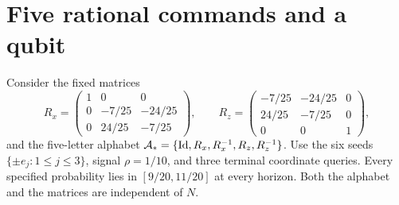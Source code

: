 \section{Five rational commands and a qubit}\label{sec:rational}
Consider the fixed matrices
\begin{equation}\label{eq:gates}
 R_x=\begin{pmatrix}1&0&0\\0&-7/25&-24/25\\0&24/25&-7/25\end{pmatrix},
 \qquad
 R_z=\begin{pmatrix}-7/25&-24/25&0\\24/25&-7/25&0\\0&0&1\end{pmatrix},
\end{equation}
and the five-letter alphabet
$\mathcal A_* =\{\operatorname{Id},R_x,R_x^{-1},R_z,R_z^{-1}\}$.
Use the six seeds $\{\pm e_j:1\le j\le3\}$, signal $\rho=1/10$,
and three terminal coordinate queries. Every specified probability lies
in $[9/20,11/20]$ at every horizon. Both the alphabet and the matrices
are independent of $N$.

